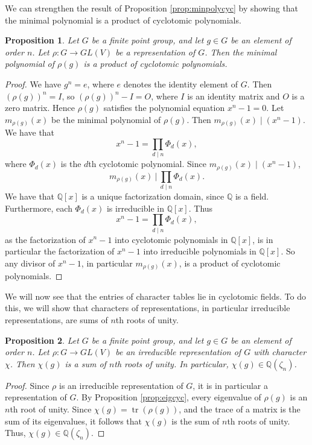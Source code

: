 \documentclass{article}
\DeclareMathOperator{\tr}{tr}
\newtheorem{proposition}{Proposition}
\begin{document}
    We can strengthen the result of Proposition \ref{prop:minpolycyc} by showing that the minimal polynomial is a product of cyclotomic polynomials.

    \enlargethispage{\baselineskip}

    \begin{proposition}
        Let $G$ be a finite point group, and let $g\in G$ be an element of order $n$. Let $\rho:G\to GL(V)$ be a representation of $G$. Then the minimal polynomial of $\rho(g)$ is a product of cyclotomic polynomials.
        \label{prop:minpolycycpoly}
    \end{proposition}
    \begin{proof}
        We have $g^n=e$, where $e$ denotes the identity element of $G$. Then $(\rho(g))^n=I$, so $(\rho(g))^n-I=O$, where $I$ is an identity matrix and $O$ is a zero matrix. Hence $\rho(g)$ satisfies the polynomial equation $x^n-1=0$. Let $m_{\rho(g)}(x)$ be the minimal polynomial of $\rho(g)$. Then $m_{\rho(g)}(x)\mid (x^n-1)$. We have that \[x^n-1=\prod_{d\mid n}\Phi_d(x),\] where $\Phi_d(x)$ is the $d$th cyclotomic polynomial. Since $m_{\rho(g)}(x)\mid(x^n-1)$, \[m_{\rho(g)}(x)~\bigg\lvert~\prod_{d\mid n}\Phi_d(x).\] We have that $\mathbb{Q}[x]$ is a unique factorization domain, since $\mathbb{Q}$ is a field. \cite{dummit} Furthermore, each $\Phi_d(x)$ is irreducible in $\mathbb{Q}[x]$. \cite{sanna} Thus \[x^n-1=\prod_{d\mid n}\Phi_d(x),\] as the factorization of $x^n-1$ into cyclotomic polynomials in $\mathbb{Q}[x]$, is in particular the factorization of $x^n-1$ into irreducible polynomials in $\mathbb{Q}[x]$. So any divisor of $x^n-1$, in particular $m_{\rho(g)}(x)$, is a product of cyclotomic polynomials.
    \end{proof}

    We will now see that the entries of character tables lie in cyclotomic fields. To do this, we will show that characters of representations, in particular irreducible representations, are sums of $n$th roots of unity.

    \begin{proposition}
        Let $G$ be a finite point group, and let $g\in G$ be an element of order $n$. Let $\rho : G\to GL(V)$ be an irreducible representation of $G$ with character $\chi$. Then $\chi(g)$ is a sum of $n$th roots of unity. In particular, $\chi(g)\in\mathbb{Q}(\zeta_n)$.
        \label{prop:charcyc}
    \end{proposition}
    \begin{proof}
        Since $\rho$ is an irreducible representation of $G$, it is in particular a representation of $G$. By Proposition \ref{prop:eigcyc}, every eigenvalue of $\rho(g)$ is an $n$th root of unity. Since $\chi(g)=\tr(\rho(g))$, and the trace of a matrix is the sum of its eigenvalues, it follows that $\chi(g)$ is the sum of $n$th roots of unity. Thus, $\chi(g)\in\mathbb{Q}(\zeta_n)$.
    \end{proof}
\end{document}
